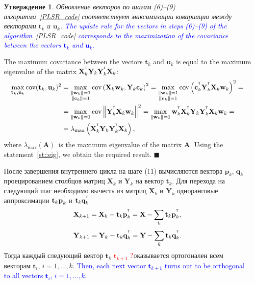 \documentclass[12pt,twoside]{article}
\newtheorem{statement}{Утверждение}
\newcommand{\bw}{\mathbf{w}}
\newcommand{\bY}{\mathbf{Y}}
\newcommand{\bX}{\mathbf{X}}
\newcommand{\bu}{\mathbf{u}}
\newcommand{\bt}{\mathbf{t}}
\newcommand{\bp}{\mathbf{p}}
\newcommand{\bq}{\mathbf{q}}
\newcommand{\bc}{\mathbf{c}}
\newcommand{\T}{^{\text{\tiny\sffamily\upshape\mdseries T}}}
\begin{document}
\begin{statement}
Обновление векторов по шагам (6)--(9) алгоритма~\ref{PLSR_code} соответствует максимизации ковариации между векторами $\bt_k$ и $\bu_k$.
\textcolor{blue}{
The update rule for the vectors in steps (6)--(9) of the algorithm~\ref{PLSR_code} corresponds to the maximization of the covariance between the vectors $\bt_k$ and $\bu_k$.}
\end{statement}
\hrulefill

The maximum covariance between the vectors $\bt_k$ and $\bu_k$ is equal to the maximum eigenvalue of the matrix $\bX_k^{\T} \bY_k \bY_k^{\T} \bX_k$:
\begin{align*}
\max_{\bt_k, \bu_k}  \text{cov} (\bt_k, \bu_k)^2 &= \max_{\substack{\|\bw_k\|=1 \\ \|\bc_k\| = 1}} \text{cov} \left( \bX_k \bw_k, \bY_k \bc_k \right)^2 = \max_{\substack{\|\bw_k\|=1 \\ \|\bc_k\| = 1}} \text{cov} \left(\bc_k^{\T}  \bY_k^{\T} \bX_k \bw_k \right)^2 = \\
&= \max_{\|\bw_k\| = 1} \text{cov} \left\|\bY_k^{\T} \bX_k \bw_k \right\|^2 = \max_{\|\bw_k\| = 1} \bw_k^{\T} \bX_k^{\T} \bY_k \bY_k^{\T} \bX_k \bw_k = \\
& = \lambda_{\max} \left( \bX_k^{\T} \bY_k \bY_k^{\T} \bX_k \right),
\end{align*}
where $ \lambda_{\max} (\mathbf{A})$~is the maximum eigenvalue of the matrix $\mathbf{A}$.
Using the statement~\ref{st::eig}, we obtain the required result.
$\blacksquare$

\hrulefill

После завершения внутреннего цикла на шаге (11) вычисляются вектора $\bp_k$, $\bq_k$ проецированием столбцов матриц $\bX_k$ и $\bY_k$ на вектор $\bt_k$. Для перехода на следующий шаг необходимо вычесть из матриц $\bX_k$ и $\bY_k$ одноранговые аппроксимации $\bt_k \bp_k^{\T}$ и $\bt_k \bq_k^{\T}$
\begin{equation*}
    \bX_{k + 1} = \bX_{k} - \bt_k \bp_k^{\T} = \bX - \sum_k \bt_k \bp_k^{\T},
\end{equation*}
\begin{equation*}
    \bY_{k + 1} = \bY_{k} - \bt_k \bq_k^{\T} = \bY - \sum_k \bt_k \bq_k^{\T}.
\end{equation*}
Тогда каждый следующий вектор $\bt_k$ \textcolor{red}{$\bt_{k+1}$ ?}оказывается ортогонален всем векторам $\bt_i$, $i=1, \dots, k$.
\textcolor{blue}{
Then, each next vector $\bt_{k+1}$ turns out to be orthogonal to all vectors $\bt_i$, $i=1, \dots, k$.}
\end{document}
